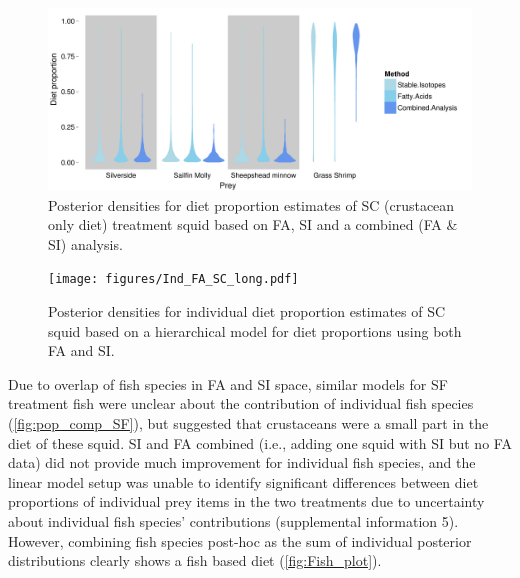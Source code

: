 \documentclass{article}%
\begin{document}
\begin{spacing}{1.9}
\begin{flushleft}
\begin{figure}
  \begin{center}
    \includegraphics[width=1\textwidth]{figures/Comp_plot_violin.pdf}
    \caption{Posterior densities for diet proportion estimates of SC (crustacean only diet)
      treatment squid based on FA, SI and a combined (FA \& SI) analysis.}
    \label{fig:pop_comp}
  \end{center}
\end{figure}


\begin{figure}
  \begin{center}
    \texttt{[image: figures/Ind\_FA\_SC\_long.pdf]}   
    \caption{Posterior densities for individual diet proportion
      estimates of SC squid based on a hierarchical
      model for diet proportions using both FA and SI.}
    \label{fig:ind_est}
  \end{center}
\end{figure}

Due to overlap of fish species in FA and SI space, similar models for
SF treatment fish were unclear about the contribution of individual
fish species (\autoref{fig:pop_comp_SF}), but suggested that
crustaceans were a small part in the diet of these squid. SI and FA
combined (i.e., adding one squid with SI but no FA data) did not
provide much improvement for individual fish species, and the linear model setup was unable to identify significant differences
between diet proportions of individual prey items in the two
treatments due to uncertainty about individual fish species'
contributions (supplemental information 5). However, combining fish species post-hoc as the sum of individual posterior
distributions clearly shows a fish based diet
(\autoref{fig:Fish_plot}). 


\end{flushleft}
\end{spacing}
\end{document}
